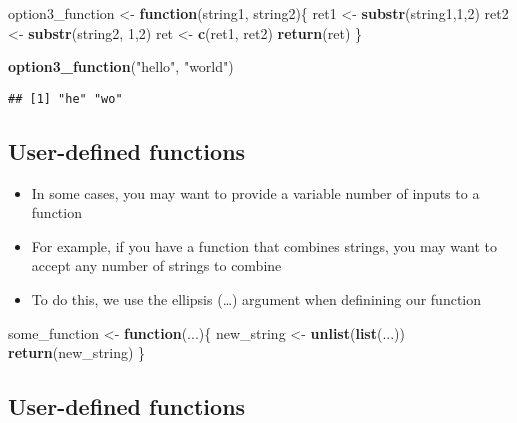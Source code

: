 \documentclass[]{article}
\newenvironment{Shaded}{\begin{snugshade}}{\end{snugshade}}
\newcommand{\KeywordTok}[1]{\textcolor[rgb]{0.13,0.29,0.53}{\textbf{#1}}}
\newcommand{\DecValTok}[1]{\textcolor[rgb]{0.00,0.00,0.81}{#1}}
\newcommand{\StringTok}[1]{\textcolor[rgb]{0.31,0.60,0.02}{#1}}
\newcommand{\ControlFlowTok}[1]{\textcolor[rgb]{0.13,0.29,0.53}{\textbf{#1}}}
\newcommand{\NormalTok}[1]{#1}
\providecommand{\tightlist}{%
  \setlength{\itemsep}{0pt}\setlength{\parskip}{0pt}}
\begin{document}
\begin{Shaded}
\begin{Highlighting}[]
\NormalTok{option3_function <-}\StringTok{ }\ControlFlowTok{function}\NormalTok{(string1, string2)\{}
\NormalTok{  ret1 <-}\StringTok{ }\KeywordTok{substr}\NormalTok{(string1,}\DecValTok{1}\NormalTok{,}\DecValTok{2}\NormalTok{)}
\NormalTok{  ret2 <-}\StringTok{ }\KeywordTok{substr}\NormalTok{(string2, }\DecValTok{1}\NormalTok{,}\DecValTok{2}\NormalTok{)}
\NormalTok{  ret <-}\StringTok{ }\KeywordTok{c}\NormalTok{(ret1, ret2)}
  \KeywordTok{return}\NormalTok{(ret)}
\NormalTok{\}}

\KeywordTok{option3_function}\NormalTok{(}\StringTok{"hello"}\NormalTok{, }\StringTok{"world"}\NormalTok{)}
\end{Highlighting}
\end{Shaded}

\begin{verbatim}
## [1] "he" "wo"
\end{verbatim}

\subsection{User-defined functions}\label{user-defined-functions}

\begin{itemize}
\tightlist
\item
  In some cases, you may want to provide a variable number of inputs to
  a function
\item
  For example, if you have a function that combines strings, you may
  want to accept any number of strings to combine
\item
  To do this, we use the ellipsis (\ldots{}) argument when definining
  our function
\end{itemize}

\begin{Shaded}
\begin{Highlighting}[]
\NormalTok{some_function <-}\StringTok{ }\ControlFlowTok{function}\NormalTok{(...)\{}
\NormalTok{  new_string <-}\StringTok{ }\KeywordTok{unlist}\NormalTok{(}\KeywordTok{list}\NormalTok{(...))}
  \KeywordTok{return}\NormalTok{(new_string)}
\NormalTok{\}}
\end{Highlighting}
\end{Shaded}

\subsection{User-defined functions}\label{user-defined-functions-1}
\end{document}
